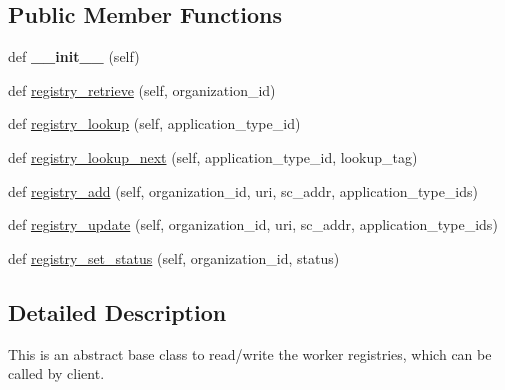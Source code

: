 \subsection*{Public Member Functions}
\begin{DoxyCompactItemize}
\item 
\mbox{\label{classavalon__sdk_1_1connector_1_1interfaces_1_1worker__registry__list_1_1WorkerRegistryList_a30b1b826ffd44a955c9b734aa2840bbd}} 
def {\bfseries \+\_\+\+\_\+init\+\_\+\+\_\+} (self)
\item 
def \hyperlink{classavalon__sdk_1_1connector_1_1interfaces_1_1worker__registry__list_1_1WorkerRegistryList_ab8b94f02d2de2581f87f60fd3a516dfd}{registry\+\_\+retrieve} (self, organization\+\_\+id)
\item 
def \hyperlink{classavalon__sdk_1_1connector_1_1interfaces_1_1worker__registry__list_1_1WorkerRegistryList_a68ae07225e81d171c25d922a4b801678}{registry\+\_\+lookup} (self, application\+\_\+type\+\_\+id)
\item 
def \hyperlink{classavalon__sdk_1_1connector_1_1interfaces_1_1worker__registry__list_1_1WorkerRegistryList_a3f32539b44fe6d922d486a8ae89cc2d3}{registry\+\_\+lookup\+\_\+next} (self, application\+\_\+type\+\_\+id, lookup\+\_\+tag)
\item 
def \hyperlink{classavalon__sdk_1_1connector_1_1interfaces_1_1worker__registry__list_1_1WorkerRegistryList_a5da3781009cf3758f0c694811636e7b6}{registry\+\_\+add} (self, organization\+\_\+id, uri, sc\+\_\+addr, application\+\_\+type\+\_\+ids)
\item 
def \hyperlink{classavalon__sdk_1_1connector_1_1interfaces_1_1worker__registry__list_1_1WorkerRegistryList_a253090eed6a5578e6fb5d0aee6b57828}{registry\+\_\+update} (self, organization\+\_\+id, uri, sc\+\_\+addr, application\+\_\+type\+\_\+ids)
\item 
def \hyperlink{classavalon__sdk_1_1connector_1_1interfaces_1_1worker__registry__list_1_1WorkerRegistryList_a9b824d1006e63cbdb74fc4dd99b65c63}{registry\+\_\+set\+\_\+status} (self, organization\+\_\+id, status)
\end{DoxyCompactItemize}


\subsection{Detailed Description}
\begin{DoxyVerb}This is an abstract base class to read/write the worker registries,
which can be called by client.
\end{DoxyVerb}
 

